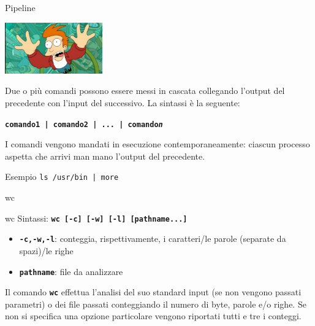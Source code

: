 \documentclass{beamer}
\begin{document}
    \begin{frame}{Pipeline}
        \begin{center}
            \includegraphics[height=2.2cm,keepaspectratio]{images/futurama.png}
        \end{center}
        Due o più comandi possono essere messi in cascata collegando l'output
        del precedente con l'input del successivo. La sintassi è la seguente: 
        
        \begin{center}
            \texttt{\textbf{comando1 | comando2 | ... | comando\textit{n}}}
        \end{center}

        I comandi vengono mandati in esecuzione contemporaneamente: ciascun processo aspetta che arrivi man mano l’output del precedente.

        \begin{exampleblock}{Esempio}
            \texttt{ls /usr/bin | more }
        \end{exampleblock}
    \end{frame}

    \begin{frame}{wc}
        \begin{block}{wc}
            Sintassi: \texttt{\textbf{wc [-c] [-w] [-l] [pathname...]}}

            \begin{itemize}
                \item \texttt{\textbf{-c,-w,-l}}: conteggia, rispettivamente, i caratteri/le parole (separate da spazi)/le righe
                \item \texttt{\textbf{pathname}}: file da analizzare
            \end{itemize}

            Il comando \texttt{\textbf{wc}} effettua l’analisi del suo standard input (se non vengono
            passati parametri) o dei file passati conteggiando il numero di byte, parole
            e/o righe. Se non si specifica una opzione particolare vengono riportati
            tutti e tre i conteggi.
        \end{block}
    \end{frame}
\end{document}
